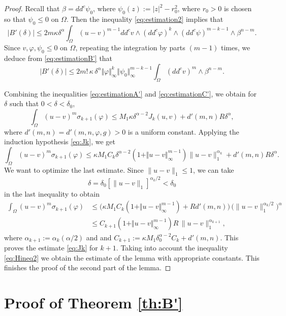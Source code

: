 \documentclass[JEP,XML,SOM,Unicode]{cedram}
\theoremstyle{definition}
\begin{document}
\begin{proof}
Recall that $\beta = dd^c \psi_0$, where $\psi_0 (z) := \vert z\vert^2 -r_0^2$, where $r_0 > 0$ is chosen so that $\psi_0 \leq 0$ on $\Omega$.
Then the inequality \eqref{eq:estimation2} implies that
\begin{equation} \label{eq:estimationB'}
|B' (\delta)| \leq 2 m \kappa \delta^{\alpha} \int_\Omega (u-v)^{m -1} dd^c v \wedge (dd^c\varphi)^k \wedge (dd^c \psi)^{m - k-1} \wedge\beta^{n-m}.
\end{equation}
Since $v, \varphi, \psi_0 \leq 0$ on $\Omega$, repeating the integration by parts $(m-1)$ times, we deduce from \eqref{eq:estimationB'} that
\begin{equation} \label{eq:estimationC'}
|B' (\delta)| \leq 2 m! \, \kappa \, \delta^{\alpha} \Vert \varphi\Vert_{\infty}^k \Vert \psi_0\Vert_{\infty}^{m - k-1} \int_\Omega (dd^c v)^m \wedge\beta^{n-m}.
\end{equation}

Combining the inequalities \eqref{eq:estimationA'} and \eqref{eq:estimationC'}, we obtain for $\delta$ such that $0 < \delta < \delta_0$,
\[
\int_{\Omega}(u-v)^m \sigma_{k +1}(\varphi)\leq M_1 \kappa \delta^{\alpha- 2} J_k (u,v)+ d'(m,n) R \delta^{\alpha},
\]
where $d'(m,n) = d'(m,n,\varphi,g) > 0$ is a uniform constant.
Applying the induction hypothesis \eqref{eq:Jk}, we get
\[
\int_{\Omega}(u-v)^m \sigma_{k +1}(\varphi)\leq \kappa M_1 C_k\delta^{\alpha- 2}  (1+\Vert u - v \Vert_{\infty}^{m -1}) \|u-v\|_1^{\alpha_k}+ d'(m,n) R \delta^{\alpha}.
\]
We want to optimize the last estimate. Since $ \|u-v\|_1 \leq 1$, we can take
\[
\delta= \delta_0 [\|u-v\|_1]^{\alpha_k\slash 2} < \delta_0
\]
in the last inequality to obtain
\begin{align*}
\int_{\Omega}(u-v)^m \sigma_{k+1}(\varphi) &\leq  \bigl(\kappa M_1 C_k (1+\Vert u - v\Vert_{\infty}^{m -1}) + R d'(m,n)\bigr)\, \bigl(\|u-v\|_1^{\alpha_k \slash 2}\bigr)^{\alpha } \\
& \leq  C_{k + 1} (1 + \Vert u - v\Vert_{\infty}^{m -1} ) R\, \|u-v\|_1^{\alpha_{k+ 1}},
\end{align*}
where $\alpha_{k + 1} := \alpha_k (\alpha \slash 2)$ and and $C_{k+1} := \kappa M_1 \delta_0^{\alpha-2}C_k + d'(m,n)$.
This proves the estimate \eqref{eq:Jk} for $k+1$. Taking into account the inequality \eqref{eq:Hineq2} we obtain the estimate of the lemma with appropriate constants. This finishes the proof of the second part of the lemma.
\end{proof}

\section{Proof of Theorem \ref{th:B'}}
\end{document}
